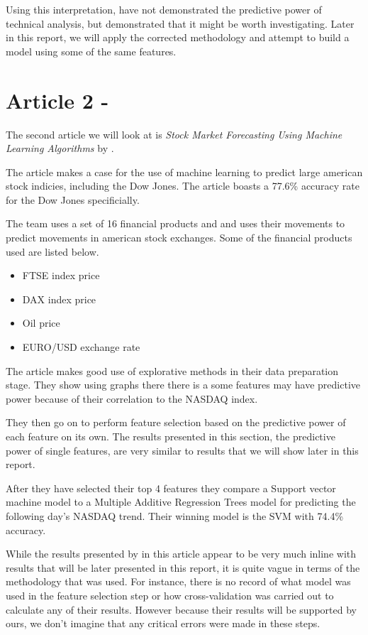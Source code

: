 \documentclass{report}
\begin{document}
Using this interpretation, \citet{kara2011predicting} have not demonstrated the predictive power of technical analysis, but demonstrated that it might be worth investigating. Later in this report, we will apply the corrected methodology and attempt to build a model using some of the same features.

\section{Article 2 - \citet{shen2012stock}}

The second article we will look at is \textit{Stock Market Forecasting Using Machine Learning Algorithms} by \citet{shen2012stock}.

The article makes a case for the use of machine learning to predict large american stock indicies, including the Dow Jones. The article boasts a 77.6\% accuracy rate for the Dow Jones specificially. 

The team uses a set of 16 financial products and and uses their movements to predict movements in american stock exchanges. Some of the financial products used are listed below.

\begin{itemize}[noitemsep]
  \item FTSE index price
  \item DAX index price
  \item Oil price
  \item EURO/USD exchange rate
\end{itemize}

The article makes good use of explorative methods in their data preparation stage. They show using graphs there there is a some features may have predictive power because of their correlation to the NASDAQ index. 

They then go on to perform feature selection based on the predictive power of each feature on its own. The results presented in this section, the predictive power of single features, are very similar to results that we will show later in this report. 

After they have selected their top 4 features they compare a Support vector machine model to a Multiple Additive Regression Trees model for predicting the following day's NASDAQ trend. Their winning model is the SVM with 74.4\% accuracy. 

While the results presented by \citet{shen2012stock} in this article appear to be very much inline with results that will be later presented in this report, it is quite vague in terms of the methodology that was used. For instance, there is no record of what model was used in the feature selection step or how cross-validation was carried out to calculate any of their results. However because their results will be supported by ours, we don't imagine that any critical errors were made in these steps.
\end{document}
